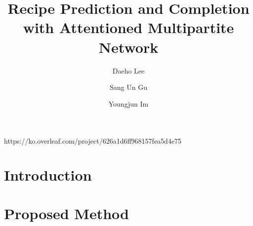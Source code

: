 \documentclass[sigconf, nonacm]{acmart}
\begin{document}
\newcommand{\beq}{\begin{equation}}
	\newcommand{\eeq}{\end{equation}}
\newcommand{\bit}{\begin{itemize*}}
	\newcommand{\eit}{\end{itemize*}}
\newcommand{\goal}[1]{ {\noindent {$\Rightarrow$} \em {#1} } }https://ko.overleaf.com/project/626a1d6ff968157fea5d4e75
\newcommand{\hide}[1]{}


\title{Recipe Prediction and Completion with Attentioned Multipartite Network}


\author{Daeho Lee}

\author{Sang Un Gu}

\author{Youngjun Im}

\begin{abstract}
	
\end{abstract}
\maketitle

\section{Introduction}
\label{sec:intro}


%

\section{Proposed Method}
\label{sec:proposed}

\end{document}
